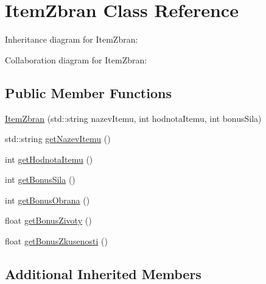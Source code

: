 \hypertarget{class_item_zbran}{\section{Item\-Zbran Class Reference}
\label{class_item_zbran}
}


Inheritance diagram for Item\-Zbran\-:


Collaboration diagram for Item\-Zbran\-:
\subsection*{Public Member Functions}
\begin{DoxyCompactItemize}
\item 
\hyperlink{class_item_zbran_ad15efffb5db06fc61302b09b0a14a95b}{Item\-Zbran} (std\-::string nazev\-Itemu, int hodnota\-Itemu, int bonus\-Sila)
\item 
std\-::string \hyperlink{class_item_zbran_af12668ffabfabfe9a5f2d378e35880f1}{get\-Nazev\-Itemu} ()
\item 
int \hyperlink{class_item_zbran_a998f92d5f818c80f2ca8955e0fb7fe12}{get\-Hodnota\-Itemu} ()
\item 
int \hyperlink{class_item_zbran_a1b26b9a921a42b64f0ce3393dbca349c}{get\-Bonus\-Sila} ()
\item 
int \hyperlink{class_item_zbran_ae59b0b219bf445432ed2a47c5622cd57}{get\-Bonus\-Obrana} ()
\item 
float \hyperlink{class_item_zbran_af758a0f1e94e30c166956d11e8bd2bd5}{get\-Bonus\-Zivoty} ()
\item 
float \hyperlink{class_item_zbran_acec2de6de0d2555786d4518129fd22b9}{get\-Bonus\-Zkusenosti} ()
\end{DoxyCompactItemize}
\subsection*{Additional Inherited Members}


